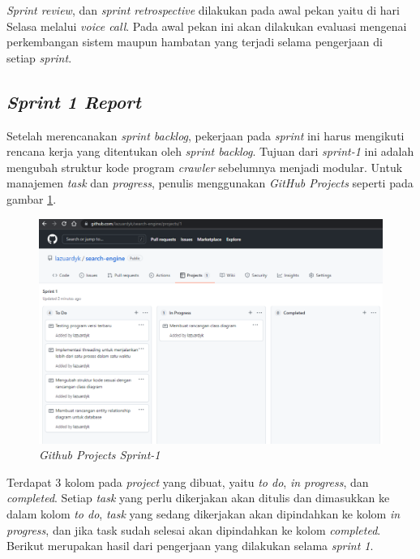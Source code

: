 \textit{Sprint review}, dan \textit{sprint retrospective} dilakukan pada awal pekan yaitu di hari Selasa melalui \textit{voice call}. Pada awal pekan ini akan dilakukan evaluasi mengenai perkembangan sistem maupun hambatan yang terjadi selama pengerjaan di setiap \textit{sprint}.

\subsection{\textit{Sprint 1 Report}}

Setelah merencanakan \textit{sprint backlog}, pekerjaan pada \textit{sprint} ini harus mengikuti rencana kerja yang ditentukan oleh \textit{sprint backlog}. Tujuan dari \textit{sprint-1} ini adalah mengubah struktur kode program \textit{crawler} sebelumnya menjadi modular. Untuk manajemen \textit{task} dan \textit{progress},  penulis menggunakan \textit{GitHub Projects} seperti pada gambar \ref{gambar:sprint1_projects}.
	
\begin{figure}[H]
	\centering
	\includegraphics[keepaspectratio, width=14cm]{gambar/sprint1_projects}
	\caption{\textit{Github Projects Sprint-1}}
	\label{gambar:sprint1_projects}
\end{figure}
	
Terdapat 3 kolom pada \textit{project} yang dibuat, yaitu \textit{to do}, \textit{in progress}, dan \textit{completed}. Setiap \textit{task} yang perlu dikerjakan akan ditulis dan dimasukkan ke dalam kolom \textit{to do}, \textit{task} yang sedang dikerjakan akan dipindahkan ke kolom \textit{in progress}, dan jika task sudah selesai akan dipindahkan ke kolom \textit{completed}. Berikut merupakan hasil dari pengerjaan yang dilakukan selama \textit{sprint 1}.

